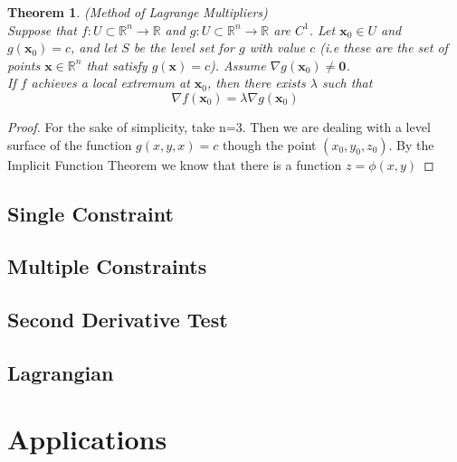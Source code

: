 \documentclass[]{article}
\newtheorem{theorem}{Theorem}
\begin{document}
\begin{theorem}(Method of Lagrange Multipliers) \\
    Suppose that $f:U\subset\mathbb{R}^{n}\to \mathbb{R}$ and $g:U\subset\mathbb{R}^{n}\to \mathbb{R}$ are $C^{1}$. Let $\pmb{x}_{0}\in U$ and $g(\pmb{x}_{0})=c$, and let $S$ be the level set for $g$ with value $c$ (i.e these are the set of points $\pmb{x}\in \mathbb{R}^{n}$ that satisfy $g(\pmb{x})=c$).
    Assume $\nabla g(\pmb{x}_{0})\neq \pmb{0}$. \\
    If $f$ achieves a local extremum at $\pmb{x}_{0}$, then there exists $\lambda$ such that
    $$
        \nabla f(\pmb{x}_{0}) = \lambda \nabla g(\pmb{x}_{0})
    $$
\end{theorem}

\begin{proof}
    For the sake of simplicity, take n=3. Then we are dealing with a level surface of the function $g(x,y,x)=c$ though the point $({x}_0,{y}_0,{z}_0)$.
    By the Implicit Function Theorem we know that there is a function $z=\phi(x,y)$

\end{proof}

\subsection{Single Constraint}

\subsection{Multiple Constraints}

\subsection{Second Derivative Test}

\subsection{Lagrangian}

\section{Applications}
\end{document}
